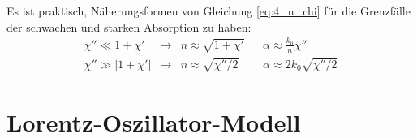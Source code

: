 Es ist praktisch, Näherungsformen von Gleichung \ref{eq:4_n_chi} für die Grenzfälle der schwachen und starken Absorption zu haben:
\begin{align}
    \chi'' \ll 1 + \chi' &  \rightarrow& n \approx \sqrt{1 + \chi'} && \alpha \approx  \frac{k_0}{n} \chi'' \\
    \chi'' \gg |1 + \chi'| & \rightarrow & n \approx \sqrt{\chi'' / 2} && \alpha \approx 2 k_0 \sqrt{ \chi'' / 2}
\end{align}



\section{Lorentz-Oszillator-Modell}


\begin{marginfigure}

\caption{Frequenzabhängigkeit des Real- und Imaginärteils des Lorentz-Oszillators. Real- und  Imaginärteil des komplexwertigen Brechungsindex $\tilde{n}$ sehen qualitativ gleich aus. \label{fig:diel_lorentz}}
\end{marginfigure}

